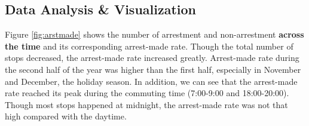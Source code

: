 \subsection{Data Analysis \& Visualization}

Figure \ref{fig:arstmade} shows the number of arrestment and non-arrestment \textbf{across the time} and its corresponding arrest-made rate. Though the total number of stops decreased, the arrest-made rate increased greatly. Arrest-made rate during the second half of the year was higher than the first half, especially in November and December, the holiday season. In addition, we can see that the arrest-made rate reached its peak during the commuting time (7:00-9:00 and 18:00-20:00). Though most stops happened at midnight, the arrest-made rate was not that high compared with the daytime.



\begin{figure*}
\caption{Arrest Across Time}
\label{fig:arstmade}
\end{figure*}


